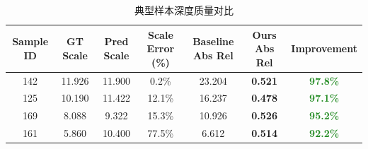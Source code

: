 
\begin{table}[htbp]
\centering
\caption{典型样本深度质量对比}
\label{tab:scalehead_samples}
\begin{tabular}{ccccccc}
\toprule
\textbf{Sample ID} & \textbf{GT Scale} & \textbf{Pred Scale} & \textbf{Scale Error (\%)} & \textbf{Baseline Abs Rel} & \textbf{Ours Abs Rel} & \textbf{Improvement} \\
\midrule
142 & 11.926 & 11.900 & 0.2\% & 23.204 & \textbf{0.521} & \textcolor{ForestGreen}{\textbf{97.8\%}} \\
125 & 10.190 & 11.422 & 12.1\% & 16.237 & \textbf{0.478} & \textcolor{ForestGreen}{\textbf{97.1\%}} \\
169 & 8.088 & 9.322 & 15.3\% & 10.926 & \textbf{0.526} & \textcolor{ForestGreen}{\textbf{95.2\%}} \\
161 & 5.860 & 10.400 & 77.5\% & 6.612 & \textbf{0.514} & \textcolor{ForestGreen}{\textbf{92.2\%}} \\
\bottomrule
\end{tabular}
\end{table}
